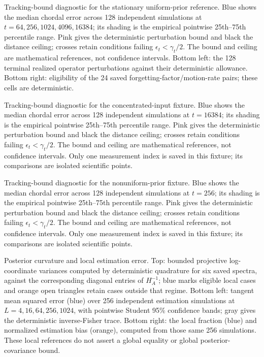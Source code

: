 \caption{Tracking-bound diagnostic for the stationary uniform-prior reference. Blue shows the median chordal error across 128 independent simulations at $t=64,256,1024,4096,16384$; its shading is the empirical pointwise 25th--75th percentile range. Pink gives the deterministic perturbation bound and black the distance ceiling; crosses retain conditions failing $\epsilon_t<\gamma_t/2$. The bound and ceiling are mathematical references, not confidence intervals. Bottom left: the 128 terminal realized operator perturbations against their deterministic allowance. Bottom right: eligibility of the 24 saved forgetting-factor/motion-rate pairs; these cells are deterministic.}

\caption{Tracking-bound diagnostic for the concentrated-input fixture. Blue shows the median chordal error across 128 independent simulations at $t=16384$; its shading is the empirical pointwise 25th--75th percentile range. Pink gives the deterministic perturbation bound and black the distance ceiling; crosses retain conditions failing $\epsilon_t<\gamma_t/2$. The bound and ceiling are mathematical references, not confidence intervals. Only one measurement index is saved in this fixture; its comparisons are isolated scientific points.}

\caption{Tracking-bound diagnostic for the nonuniform-prior fixture. Blue shows the median chordal error across 128 independent simulations at $t=256$; its shading is the empirical pointwise 25th--75th percentile range. Pink gives the deterministic perturbation bound and black the distance ceiling; crosses retain conditions failing $\epsilon_t<\gamma_t/2$. The bound and ceiling are mathematical references, not confidence intervals. Only one measurement index is saved in this fixture; its comparisons are isolated scientific points.}

\caption{Posterior curvature and local estimation error. Top: bounded projective log-coordinate variances computed by deterministic quadrature for six saved spectra, against the corresponding diagonal entries of $H_A^{-1}$; blue marks eligible local cases and orange open triangles retain cases outside that regime. Bottom left: tangent mean squared error (blue) over 256 independent estimation simulations at $L=4,16,64,256,1024$, with pointwise Student 95\% confidence bands; gray gives the deterministic inverse-Fisher trace. Bottom right: the local fraction (blue) and normalized estimation bias (orange), computed from those same 256 simulations. These local references do not assert a global equality or global posterior-covariance bound.}

